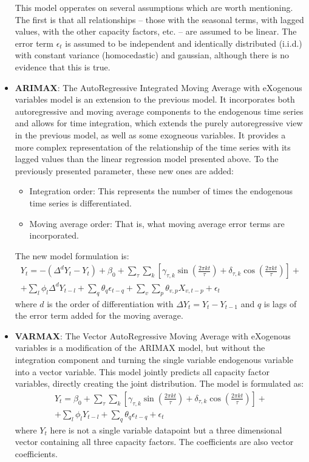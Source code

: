 \begin{itemize}
    This model opperates on several assumptions which are worth mentioning. The first is that all relationships -- those with the seasonal terms, with lagged values, with the other capacity factors, etc. -- are assumed to be linear. The error term $\epsilon_t$ is assumed to be independent and identically distributed (i.i.d.) with constant variance (homocedastic) and gaussian, although there is no evidence that this is true. 
    \item \textbf{ARIMAX}: The AutoRegressive Integrated Moving Average with eXogenous variables model is an extension to the previous model. It incorporates both autoregressive and moving average components to the endogenous time series and allows for time  integration, which extends the purely autoregressive view in the previous model, as well as some exogneous variables. It provides a more complex representation of the relationship of the time series with its lagged values than the linear regression model presented above. To the previously presented parameter, these new ones are added:
    \begin{itemize}
        \item Integration order: This represents the number of times the endogenous time series is differentiated. 
        \item Moving average order: That is, what moving average error terms are incorporated.
    \end{itemize}  
    The new model formulation is:
    \begin{multline}
        Y_t=-\left(\Delta^d Y_t - Y_t\right) + \beta_0 + \sum_{\tau}\sum_{k}\left[\gamma_{\tau,k}\sin\left(\frac{2\pi k t}{\tau}\right) + \delta_{\tau,k}\cos\left(\frac{2\pi k t}{\tau}\right)\right] +\\+ \sum_l \phi_l \Delta^d Y_{t-l} + \sum_q \theta_q \epsilon_{t-q} + \sum_v\sum_p\theta_{v,p}X_{v,t-p} + \epsilon_t
    \end{multline}
    where $d$ is the order of differentiation with $\Delta Y_t = Y_t - Y_{t-1}$ and $q$ is lags of the error term added for the moving average.
    \item \textbf{VARMAX}: The Vector AutoRegressive Moving Average with eXogenous variables is a modification of the ARIMAX model, but without the integration component and turning the single variable endogenous variable into a vector variable. This model jointly predicts all capacity factor variables, directly creating the joint distribution. The model is formulated as:
    \begin{multline}
        Y_t= \beta_0 + \sum_{\tau}\sum_{k}\left[\gamma_{\tau,k}\sin\left(\frac{2\pi k t}{\tau}\right) + \delta_{\tau,k}\cos\left(\frac{2\pi k t}{\tau}\right)\right] +\\+ \sum_l \phi_l Y_{t-l} + \sum_q \theta_q \epsilon_{t-q} + \epsilon_t
    \end{multline}
    where $Y_t$ here is not a single variable datapoint but a three dimensional vector containing all three capacity factors. The coefficients are also vector coefficients.
\end{itemize}

